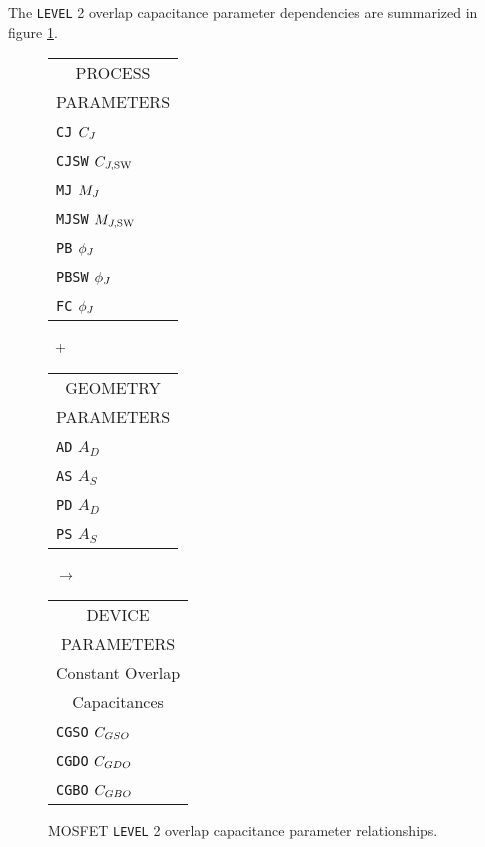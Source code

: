 {{
The {\tt LEVEL} 2 overlap capacitance parameter dependencies are summarized in
figure \ref{mlevel2overlap}.
\begin{figure}
\parbox[t]{1.3in}{
\begin{tabular}[t]{|p{1in}|}
\hline
\multicolumn{1}{|c|}{PROCESS} \\
\multicolumn{1}{|c|}{PARAMETERS} \\
\hline
\hline
{\tt CJ} \hfill $C_J$\\
{\tt CJSW} \hfill $C_{J,\mbox{\scriptsize SW}}$\\
{\tt MJ} \hfill $M_J$\\
{\tt MJSW} \hfill $M_{J,\mbox{\scriptsize SW}}$\\
{\tt PB} \hfill $\phi_J$\\
{\tt PBSW} \hfill $\phi_J$\\
{\tt FC} \hfill $\phi_J$\\
\hline
\end{tabular}
}
\hfill
\parbox{0.1in}{\ \vspace*{0.2in}\newline +}
\hfill
\begin{tabular}[t]{|p{1in}|}
\hline
\multicolumn{1}{|c|}{GEOMETRY} \\
\multicolumn{1}{|c|}{PARAMETERS} \\
\hline
{\tt AD} \hfill $A_D$\\
{\tt AS} \hfill $A_S$\\
{\tt PD} \hfill $A_D$\\
{\tt PS} \hfill $A_S$\\
\hline
\end{tabular}
\hfill
\parbox{0.1in}{\ \vspace*{0.2in}\newline $\rightarrow$}
\hfill
\begin{tabular}[t]{|p{1.8in}|}
\hline
\multicolumn{1}{|c|}{DEVICE} \\
\multicolumn{1}{|c|}{PARAMETERS} \\
\hline
\hline
\multicolumn{1}{|c|}{Constant Overlap}\\
\multicolumn{1}{|c|}{Capacitances}\\
\hline
{\tt CGSO} \hfill $C_{GSO}$\\
{\tt CGDO} \hfill $C_{GDO}$\\
{\tt CGBO} \hfill $C_{GBO}$\\
\hline
\end{tabular}
\caption{ MOSFET {\tt LEVEL} 2 overlap capacitance parameter relationships.
\label{mlevel2overlap}}
\end{figure}}
\\[0.2in]}

